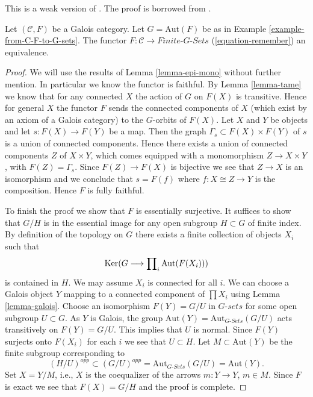 \begin{proposition}
\label{proposition-galois}
\begin{reference}
This is a weak version of \cite[Expos\'e V]{SGA1}.
The proof is borrowed from \cite[Theorem 7.2.5]{BS}.
\end{reference}
Let $(\mathcal{C}, F)$ be a Galois category. Let $G = \text{Aut}(F)$
be as in Example \ref{example-from-C-F-to-G-sets}. The functor
$F : \mathcal{C} \to \textit{Finite-}G\textit{-Sets}$
(\ref{equation-remember}) an equivalence.
\end{proposition}

\begin{proof}
We will use the results of Lemma \ref{lemma-epi-mono} without further mention.
In particular we know the functor is faithful.
By Lemma \ref{lemma-tame} we know that for any connected $X$ the
action of $G$ on $F(X)$ is transitive. Hence for general $X$ the functor
$F$ sends the connected components of $X$ (which exist by
an axiom of a Galois category) to the $G$-orbits of $F(X)$.
Let $X$ and $Y$ be objects and let
$s : F(X) \to F(Y)$ be a map. Then the graph
$\Gamma_s \subset F(X) \times F(Y)$ of $s$
is a union of connected components. Hence there exists a
union of connected components $Z$ of $X \times Y$,
which comes equipped with a monomorphism $Z \to X \times Y$,
with $F(Z) = \Gamma_s$. Since $F(Z) \to F(X)$ is bijective
we see that $Z \to X$ is an isomorphism and we conclude
that $s = F(f)$ where $f : X \cong Z \to Y$ is the composition.
Hence $F$ is fully faithful.

\medskip\noindent
To finish the proof we show that $F$ is essentially surjective.
It suffices to show that $G/H$ is in the essential image for
any open subgroup $H \subset G$ of finite index.
By definition of the topology on $G$ there exists a finite
collection of objects $X_i$ such that
$$
\mathop{\mathrm{Ker}}(G \longrightarrow \prod\nolimits_i \text{Aut}(F(X_i)))
$$
is contained in $H$. We may assume $X_i$ is connected
for all $i$. We can choose a Galois object $Y$ mapping
to a connected component of $\prod X_i$ using
Lemma \ref{lemma-galois}. Choose an isomorphism $F(Y) = G/U$
in $G\textit{-sets}$ for some open subgroup $U \subset G$.
As $Y$ is Galois, the group
$\text{Aut}(Y) = \text{Aut}_{G\textit{-Sets}}(G/U)$ acts transitively
on $F(Y) = G/U$. This implies that $U$ is normal. Since
$F(Y)$ surjects onto $F(X_i)$ for each $i$ we see that
$U \subset H$. Let $M \subset \text{Aut}(Y)$ be the finite subgroup
corresponding to
$$
(H/U)^{opp} \subset (G/U)^{opp} = \text{Aut}_{G\textit{-Sets}}(G/U)
= \text{Aut}(Y).
$$
Set $X = Y/M$, i.e., $X$ is the coequalizer
of the arrows $m : Y \to Y$, $m \in M$.
Since $F$ is exact we see that $F(X) = G/H$ and the
proof is complete.
\end{proof}


